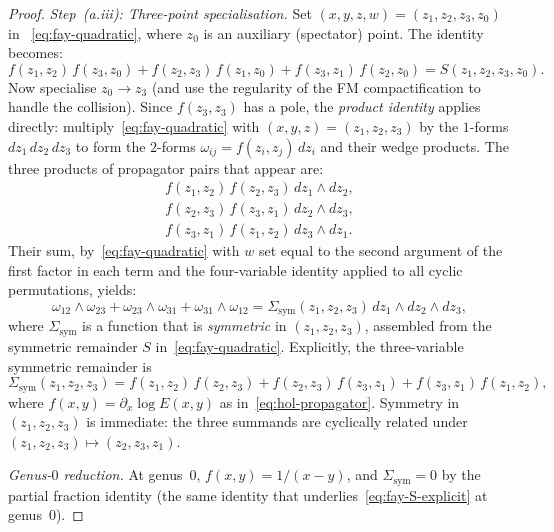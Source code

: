 \begin{proof}
\medskip
\emph{Step~(a.iii): Three-point specialisation.}
Set $(x, y, z, w) = (z_1, z_2, z_3, z_0)$ in~%
\eqref{eq:fay-quadratic}, where $z_0$ is an auxiliary
(spectator) point. The identity becomes:
\begin{equation}\label{eq:fay-three-point}
 f(z_1, z_2)\, f(z_3, z_0)
 + f(z_2, z_3)\, f(z_1, z_0)
 + f(z_3, z_1)\, f(z_2, z_0)
 = S(z_1, z_2, z_3, z_0).
\end{equation}
Now specialise $z_0 \to z_3$ (and use the regularity of the
FM compactification to handle the collision).
Since $f(z_3, z_3)$ has a pole, the \emph{product identity}
applies directly: multiply~\eqref{eq:fay-quadratic}
with $(x,y,z) = (z_1, z_2, z_3)$ by the $1$-forms
$dz_1\, dz_2\, dz_3$ to form the $2$-forms
$\omega_{ij} = f(z_i, z_j)\, dz_i$ and their wedge products.
The three products of propagator pairs that appear are:
\begin{align*}
 f(z_1, z_2)\, f(z_2, z_3)\, dz_1 \wedge dz_2, \\
 f(z_2, z_3)\, f(z_3, z_1)\, dz_2 \wedge dz_3, \\
 f(z_3, z_1)\, f(z_1, z_2)\, dz_3 \wedge dz_1.
\end{align*}
Their sum, by~\eqref{eq:fay-quadratic} with $w$ set equal to the
second argument of the first factor in each term and the
four-variable identity applied to all cyclic permutations, yields:
\begin{equation}\label{eq:fay-sum-symmetric}
 \omega_{12} \wedge \omega_{23}
 + \omega_{23} \wedge \omega_{31}
 + \omega_{31} \wedge \omega_{12}
 = \Sigma_{\mathrm{sym}}(z_1, z_2, z_3)\, dz_1 \wedge dz_2 \wedge dz_3,
\end{equation}
where $\Sigma_{\mathrm{sym}}$ is a function that is
\emph{symmetric} in $(z_1, z_2, z_3)$, assembled from the
symmetric remainder $S$ in~\eqref{eq:fay-quadratic}.
Explicitly, the three-variable symmetric remainder is
\begin{equation}\label{eq:fay-three-variable-S}
 \Sigma_{\mathrm{sym}}(z_1, z_2, z_3)
 = f(z_1,z_2)\,f(z_2,z_3)
 + f(z_2,z_3)\,f(z_3,z_1)
 + f(z_3,z_1)\,f(z_1,z_2),
\end{equation}
where $f(x,y) = \partial_x \log E(x,y)$ as
in~\eqref{eq:hol-propagator}. Symmetry in $(z_1, z_2, z_3)$
is immediate: the three summands are cyclically related under
$(z_1, z_2, z_3) \mapsto (z_2, z_3, z_1)$.

\smallskip\noindent
\emph{Genus-$0$ reduction.}
At genus~$0$, $f(x,y) = 1/(x-y)$, and
$\Sigma_{\mathrm{sym}} = 0$ by the partial fraction identity
(the same identity that underlies~\eqref{eq:fay-S-explicit}
at genus~$0$).


\end{proof}

